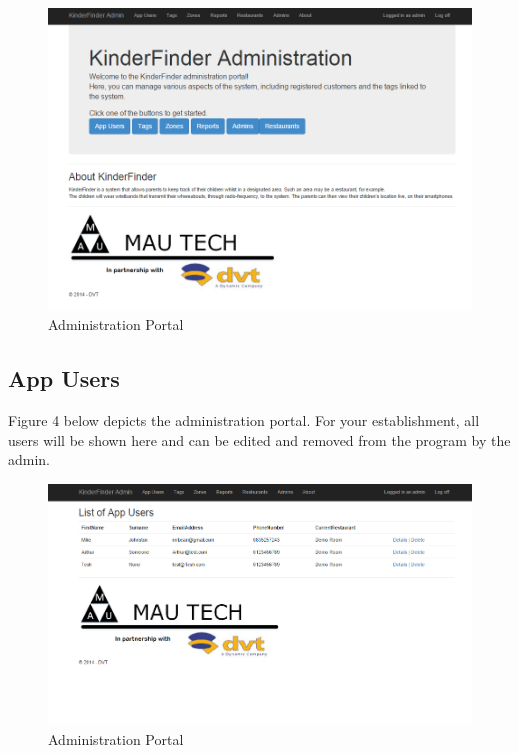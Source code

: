 \documentclass{article}
\begin{document}
\begin{figure}[H]
\centering
\includegraphics[scale=0.6]{adminportal2.png}
\caption{Administration Portal}
\end{figure}

\subsection{App Users}
Figure 4 below depicts the administration portal. For your establishment, all users will be shown here and can be edited and removed from the program by the admin.

\begin{figure}[H]
\centering
\includegraphics[scale=0.6]{adminportal3.png}
\caption{Administration Portal}
\end{figure}
\end{document}
